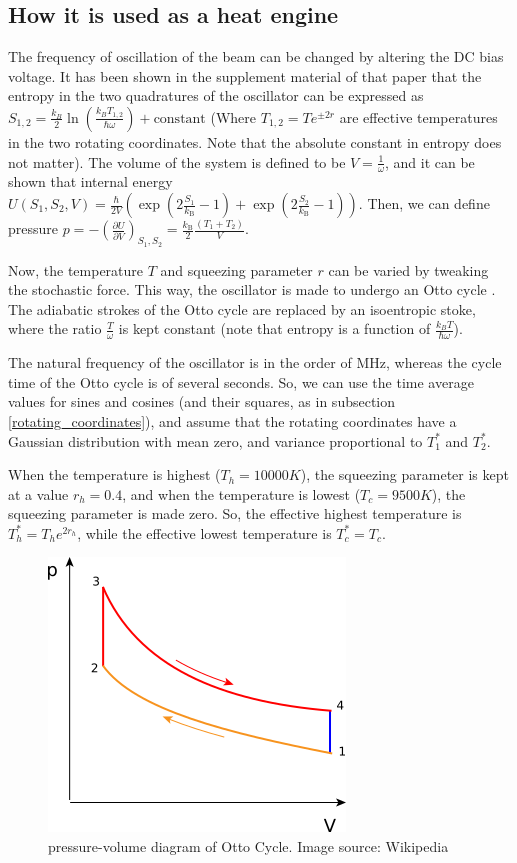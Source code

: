 \documentclass[12pt, twoside]{article}
\begin{document}
\subsection{How it is used as a heat engine}
The frequency of oscillation of the beam can be changed by altering the DC bias voltage. It has been shown in the supplement material \cite{klaers_supplement} of that paper that the entropy in the two quadratures of the oscillator can be expressed as $S_{1,2} = \frac{k_B}{2} \ln (\frac{k_B T_{1,2}}{\hbar \omega}) + \text{constant}$ (Where $T_{1,2} = T e^{\pm 2r}$ are effective temperatures in the two rotating coordinates. Note that the absolute constant in entropy does not matter). The volume of the system is defined to be $V = \frac{1}{\omega}$, and it can be shown that internal energy $U \left( S _ { 1 } , S _ { 2 } , V \right) = \frac { \hbar } { 2 V } \left( \exp \left( 2 \frac{S _ { 1 }} { k _ { \mathrm { B } }} - 1 \right) + \exp \left( 2 \frac{S _ { 2 }} { k _ { \mathrm { B } }} - 1 \right) \right)$. Then, we can define pressure $p = - \left( \frac { \partial U } { \partial V } \right) _ { S _ { 1 } , S _ { 2 } } = \frac { k _ { \mathrm { B } } } { 2 } \frac { \left( T _ { 1 } + T _ { 2 } \right) } { V }$.

Now, the temperature $T$ and squeezing parameter $r$ can be varied by tweaking the stochastic force. This way, the oscillator is made to undergo an Otto cycle \cite{resnick_halliday}. The adiabatic strokes of the Otto cycle are replaced by an isoentropic stoke, where the ratio $\frac{T}{\omega}$ is kept constant (note that entropy is a function of $\frac{k_B T}{\hbar \omega}$).

The natural frequency of the oscillator is in the order of MHz, whereas the cycle time of the Otto cycle is of several seconds. So, we can use the time average values for sines and cosines (and their squares, as in subsection \ref{rotating_coordinates}), and assume that the rotating coordinates have a Gaussian distribution with mean zero, and variance proportional to $T^*_1$ and $T^*_2$.

When the temperature is highest ($T_h = 10000 K$), the squeezing parameter is kept at a value $r_h = 0.4$, and when the temperature is lowest ($T_c = 9500 K$), the squeezing parameter is made zero. So, the effective highest temperature is $T^*_h = T_h e^{2r_h}$, while the effective lowest temperature is $T^*_c = T_c$.

\begin{figure}[h!]
	\centering
	\includegraphics[width=0.4\linewidth]{graphs/P-V_Otto_cycle.png}
	\caption{pressure-volume diagram of Otto Cycle. Image source: Wikipedia \cite{image_reference}}
	\label{fig:Otto_cycle}
\end{figure}
\end{document}

